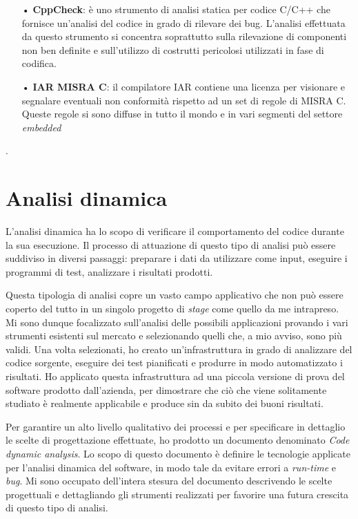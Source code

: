 \begin{itemize}
\item[•] \textbf{CppCheck}: è uno strumento di analisi statica per codice C/C++ che fornisce un'analisi del codice in grado di rilevare dei bug. L'analisi effettuata da questo strumento si concentra soprattutto sulla rilevazione di componenti non ben definite e sull'utilizzo di costrutti pericolosi utilizzati in fase di codifica.

\item[•] \textbf{IAR MISRA C}: il compilatore IAR contiene una licenza per visionare e segnalare eventuali non conformità rispetto ad un set di regole di MISRA C. Queste regole si sono diffuse in tutto il mondo e in vari segmenti del settore \textit{embedded}
\end{itemize}.

\section{Analisi dinamica}

L'analisi dinamica ha lo scopo di verificare il comportamento del codice durante la sua esecuzione. Il processo di attuazione di questo tipo di analisi può essere suddiviso in diversi passaggi: preparare i dati da utilizzare come input, eseguire i programmi di test, analizzare i risultati prodotti.

Questa tipologia di analisi copre un vasto campo applicativo che non può essere coperto del tutto in un singolo progetto di \textit{stage} come quello da me intrapreso. Mi sono dunque focalizzato sull'analisi delle possibili applicazioni provando i vari strumenti esistenti sul mercato e selezionando quelli che, a mio avviso, sono più validi. Una volta selezionati, ho creato un'infrastruttura in grado di analizzare del codice sorgente, eseguire dei test pianificati e produrre in modo automatizzato i risultati. Ho applicato questa infrastruttura ad una piccola versione di prova del software prodotto dall'azienda, per dimostrare che ciò che viene solitamente studiato è realmente applicabile e produce sin da subito dei buoni risultati.

Per garantire un alto livello qualitativo dei processi e per specificare in dettaglio le scelte di progettazione effettuate, ho prodotto un documento denominato \textit{Code dynamic analysis}.
Lo scopo di questo documento è definire le tecnologie applicate per l'analisi dinamica del software, in modo tale da evitare errori a \textit{run-time} e \textit{bug}. Mi sono occupato dell'intera stesura del documento descrivendo le scelte progettuali e dettagliando gli strumenti realizzati per favorire una futura crescita di questo tipo di analisi.

